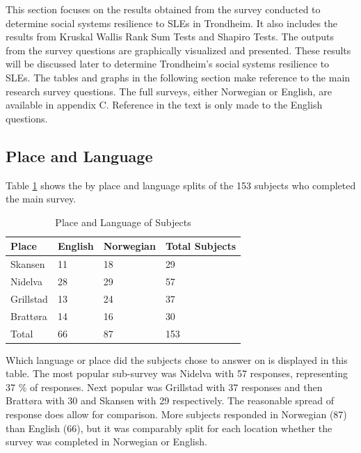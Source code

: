 This section focuses on the results obtained from the survey conducted to determine social systems resilience to SLEs in Trondheim.  It also includes the results from Kruskal Wallis Rank Sum Tests and Shapiro Tests. The outputs from the survey questions are graphically visualized and presented. These results will be discussed later to determine Trondheim's social systems resilience to SLEs. The tables and graphs in the following section make reference to the main research survey questions. The full surveys, either Norwegian or English, are available in appendix C. Reference in the text is only made to the English questions. 



\subsection{Place and Language}
Table \ref{tab:place_language} shows the by place and language splits of the 153 subjects who completed the main survey. 
\begin{table}[H]
    \centering
    \begin{tabular}{|l|l|l|l|}
    \hline
    \textbf{Place}  & \textbf{ English} & \textbf{Norwegian} & \textbf{Total Subjects}  \\ \hline
      Skansen & 11 & 18  & 29    \\ \hline
      Nidelva & 28 & 29 & 57      \\ \hline
      Grillstad & 13 & 24 & 37       \\ \hline
      Brattøra & 14 & 16 & 30     \\ \hline
      Total & 66 & 87 & 153   \\ \hline
     \end{tabular}
    \caption{Place and Language of Subjects}{ Which language or place did the subjects chose to answer on is displayed in this table. The most popular sub-survey was Nidelva with 57 responses, representing 37 \% of responses. Next popular was Grillstad with 37 responses and then Brattøra with 30 and Skansen with 29 respectively. The reasonable spread of response does allow for comparison. More subjects responded in Norwegian (87) than English (66), but it was comparably split for each location whether the survey was completed in Norwegian or English. }
    \label{tab:place_language}
\end{table}
\paragraph{}

